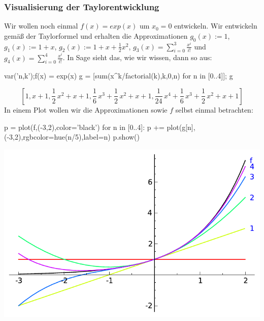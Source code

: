 \documentclass[fontsize=12pt,paper=a4,twoside,bibtotoc,idxtotoc,
liststotoc,pagesize,BCOR1.2cm,DIV15,chapterprefix,pagesize=pdftex]{scrbook}
\theoremstyle{plain}
\theoremstyle{definition}
\theoremstyle{remark}
\begin{document}
\subsubsection{Visualisierung der Taylorentwicklung}
Wir wollen noch einmal $f(x)=exp(x)$ um $x_0=0$ entwickeln. Wir entwickeln gemäß der Taylorformel und erhalten die
Approximationen $g_0(x):=1$, $g_1(x):=1+x$,
$g_2(x):=1+x+\frac{1}{2}x^2$, $g_3(x)=\sum_{i=0}^3 \frac{x^i}{i!}$ und 
$g_4(x)=\sum_{i=0}^4 \frac{x^i}{i!}$. In Sage sieht das, wie wir wissen, dann so aus:
\begin{sagein}
var('n,k');f(x) = exp(x)
g = [sum(x^k/factorial(k),k,0,n) for n in [0..4]]; g
\end{sagein}
{\color{blue}\[ \left[1, x + 1, \frac{1}{2} \, x^{2} + x + 1, \frac{1}{6} \, x^{3} +
\frac{1}{2} \, x^{2} + x + 1, \frac{1}{24} \, x^{4} + \frac{1}{6} \,
x^{3} + \frac{1}{2} \, x^{2} + x + 1\right]\]}
In einem Plot wollen wir die Approximationen sowie $f$ selbst einmal betrachten:
\begin{sagein}
p = plot(f,(-3,2),color='black')
for n in [0..4]:
    p += plot(g[n],(-3,2),rgbcolor=hue(n/5),label=n)
p.show()
\end{sagein}
 \begin{center}
  \includegraphics[width=\textwidth]{taylorexp.pdf}
 \end{center}
\end{document}
